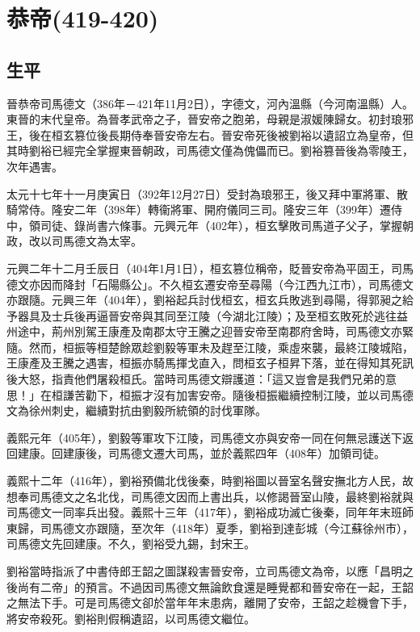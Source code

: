 
\section{恭帝\tiny(419-420)}

\subsection{生平}

晉恭帝司馬德文（386年－421年11月2日），字德文，河內溫縣（今河南溫縣）人。東晉的末代皇帝。為晉孝武帝之子，晉安帝之胞弟，母親是淑媛陳歸女。初封琅邪王，後在桓玄篡位後長期侍奉晉安帝左右。晉安帝死後被劉裕以遺詔立為皇帝，但其時劉裕已經完全掌握東晉朝政，司馬德文僅為傀儡而已。劉裕篡晉後為零陵王，次年遇害。

太元十七年十一月庚寅日（392年12月27日）受封為琅邪王，後又拜中軍將軍、散騎常侍。隆安二年（398年）轉衞將軍、開府儀同三司。隆安三年（399年）遷侍中，領司徒、錄尚書六條事。元興元年（402年），桓玄擊敗司馬道子父子，掌握朝政，改以司馬德文為太宰。

元興二年十二月壬辰日（404年1月1日），桓玄篡位稱帝，貶晉安帝為平固王，司馬德文亦因而降封「石陽縣公」。不久桓玄遷安帝至尋陽（今江西九江市），司馬德文亦跟隨。元興三年（404年），劉裕起兵討伐桓玄，桓玄兵敗逃到尋陽，得郭昶之給予器具及士兵後再逼晉安帝與其同至江陵（今湖北江陵）；及至桓玄敗死於逃往益州途中，荊州別駕王康產及南郡太守王騰之迎晉安帝至南郡府舍時，司馬德文亦緊隨。然而，桓振等桓楚餘眾趁劉毅等軍未及趕至江陵，乘虛來襲，最終江陵城陷，王康產及王騰之遇害，桓振亦騎馬揮戈直入，問桓玄子桓昇下落，並在得知其死訊後大怒，指責他們屠殺桓氏。當時司馬德文辯護道：「這又豈會是我們兄弟的意思！」在桓謙苦勸下，桓振才沒有加害安帝。隨後桓振繼續控制江陵，並以司馬德文為徐州刺史，繼續對抗由劉毅所統領的討伐軍隊。

義熙元年（405年），劉毅等軍攻下江陵，司馬德文亦與安帝一同在何無忌護送下返回建康。回建康後，司馬德文遷大司馬，並於義熙四年（408年）加領司徒。

義熙十二年（416年），劉裕預備北伐後秦，時劉裕圖以晉室名聲安撫北方人民，故想奉司馬德文之名北伐，司馬德文因而上書出兵，以修謁晉室山陵，最終劉裕就與司馬德文一同率兵出發。義熙十三年（417年），劉裕成功滅亡後秦，同年年末班師東歸，司馬德文亦跟隨，至次年（418年）夏季，劉裕到達彭城（今江蘇徐州市），司馬德文先回建康。不久，劉裕受九錫，封宋王。

劉裕當時指派了中書侍郎王韶之圖謀殺害晉安帝，立司馬德文為帝，以應「昌明之後尚有二帝」的預言。不過因司馬德文無論飲食還是睡覺都和晉安帝在一起，王韶之無法下手。可是司馬德文卻於當年年末患病，離開了安帝，王韶之趁機會下手，將安帝殺死。劉裕則假稱遺詔，以司馬德文繼位。

